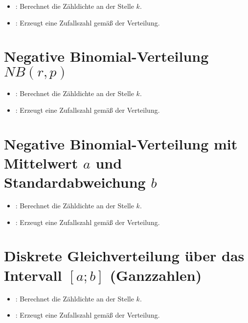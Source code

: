 \begin{itemize}

\item
{}:
Berechnet die Zähldichte an der Stelle $k$.

\item
{}:
Erzeugt eine Zufallszahl gemäß der Verteilung.

\end{itemize}



\section{Negative Binomial-Verteilung \texorpdfstring{$NB(r,p)$}{NB(r,p)}}

\begin{itemize}

\item
{}:
Berechnet die Zähldichte an der Stelle $k$.


\item
{}:
Erzeugt eine Zufallszahl gemäß der Verteilung.

\end{itemize}



\section{Negative Binomial-Verteilung mit Mittelwert \texorpdfstring{$a$}{a} und Standardabweichung \texorpdfstring{$b$}{b}}

\begin{itemize}

\item
{}:
Berechnet die Zähldichte an der Stelle $k$.


\item
{}:
Erzeugt eine Zufallszahl gemäß der Verteilung.

\end{itemize}



\section{Diskrete Gleichverteilung über das Intervall \texorpdfstring{$[a;b]$}{[a;b]} (Ganzzahlen)}

\begin{itemize}

\item
{}:
Berechnet die Zähldichte an der Stelle $k$.

\item
{}:
Erzeugt eine Zufallszahl gemäß der Verteilung.

\end{itemize}



